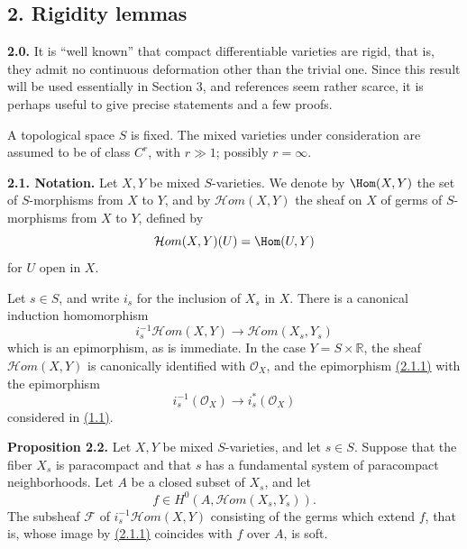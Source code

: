 \subsection*{2. Rigidity lemmas}

\textbf{2.0.} It is ``well known'' that compact differentiable varieties are rigid, that is, they admit no continuous deformation other than the trivial one. Since this result will be used essentially in Section 3, and references seem rather scarce, it is perhaps useful to give precise statements and a few proofs.

A topological space $S$ is fixed. The mixed varieties under consideration are assumed to be of class $C^r$, with $r\gg1$; possibly $r=\infty$.

\textbf{2.1. Notation.} Let $X,Y$ be mixed $S$-varieties. We denote by $\Hom(X,Y)$ the set of $S$-morphisms from $X$ to $Y$, and by $\mathcal Hom(X,Y)$ the sheaf on $X$ of germs of $S$-morphisms from $X$ to $Y$, defined by
\[
 \mathcal Hom(X,Y)(U)=\Hom(U,Y)
\]
for $U$ open in $X$.

Let $s\in S$, and write $i_s$ for the inclusion of $X_s$ in $X$. There is a canonical induction homomorphism
\begin{equation}\tag{2.1.1}
 i_s^{-1}\mathcal Hom(X,Y)\longrightarrow \mathcal Hom(X_s,Y_s)
\end{equation}
which is an epimorphism, as is immediate. In the case $Y=S\times\mathbb R$, the sheaf $\mathcal Hom(X,Y)$ is canonically identified with $\mathcal O_X$, and the epimorphism \hyperlink{sga6.e02.eq.2-1-1}{(2.1.1)} with the epimorphism
\[
 i_s^{-1}(\mathcal O_X)\longrightarrow i_s^*(\mathcal O_X)
\]
considered in \hyperlink{sga6.e02.sec.1.1}{(1.1)}.

\textbf{Proposition 2.2.} Let $X,Y$ be mixed $S$-varieties, and let $s\in S$. Suppose that the fiber $X_s$ is paracompact and that $s$ has a fundamental system of paracompact neighborhoods. Let $A$ be a closed subset of $X_s$, and let
\[
 f\in H^0(A,\mathcal Hom(X_s,Y_s)).
\]
The subsheaf $\mathcal F$ of $i_s^{-1}\mathcal Hom(X,Y)$ consisting of the germs which extend $f$, that is, whose image by \hyperlink{sga6.e02.eq.2-1-1}{(2.1.1)} coincides with $f$ over $A$, is soft.

